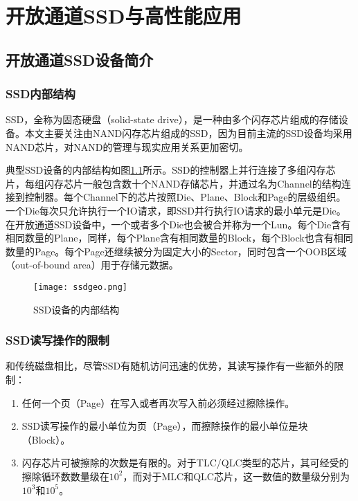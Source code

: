 \chapter{开放通道SSD与高性能应用}
\label{cha:ssd_hpc}

\section{开放通道SSD设备简介}
\subsection{SSD内部结构}
SSD，全称为固态硬盘（solid-state drive），是一种由多个闪存芯片组成的存储设备。本文主要关注由NAND闪存芯片组成的SSD，因为目前主流的SSD设备均采用NAND芯片，对NAND的管理与现实应用关系更加密切。

典型SSD设备的内部结构如图\ref{fig:ssd_geo}所示。SSD的控制器上并行连接了多组闪存芯片，每组闪存芯片一般包含数十个NAND存储芯片，并通过名为Channel的结构连接到控制器。每个Channel下的芯片按照Die、Plane、Block和Page的层级组织。一个Die每次只允许执行一个IO请求，即SSD并行执行IO请求的最小单元是Die。在开放通道SSD设备中，一个或者多个Die也会被合并称为一个Lun。每个Die含有相同数量的Plane，同样，每个Plane含有相同数量的Block，每个Block也含有相同数量的Page。每个Page还继续被分为固定大小的Sector，同时包含一个OOB区域（out-of-bound area）用于存储元数据。

\begin{figure}[H]
  \centering
  \texttt{[image: ssdgeo.png]}
  \caption{SSD设备的内部结构}
  \label{fig:ssd_geo}
\end{figure}

\subsection{SSD读写操作的限制}
和传统磁盘相比，尽管SSD有随机访问迅速的优势，其读写操作有一些额外的限制：

\begin{enumerate}[1.]
\item 任何一个页（Page）在写入或者再次写入前必须经过擦除操作。
\item SSD读写操作的最小单位为页（Page），而擦除操作的最小单位是块（Block）。
\item 闪存芯片可被擦除的次数是有限的。对于TLC/QLC类型的芯片，其可经受的擦除循环数数量级在$10^2$，而对于MLC和QLC芯片，这一数值的数量级分别为$10^3$和$10^5$。
\end{enumerate}

